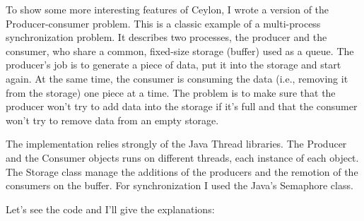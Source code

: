 
To show some more interesting features of Ceylon, I wrote a version of the
Producer-consumer problem. This is a classic example of a multi-process
synchronization problem. It describes two processes, the producer and the
consumer, who share a common, fixed-size storage (buffer) used as a queue. The
producer's job is to generate a piece of data, put it into the storage and start
again. At the same time, the consumer is consuming the data (i.e., removing it
from the storage) one piece at a time. The problem is to make sure that the
producer won't try to add data into the storage if it's full and that the
consumer won't try to remove data from an empty storage\cite{2_1}.

The implementation relies strongly of the Java Thread libraries. The Producer
and the Consumer objects runs on different threads, each instance of each
object. The Storage class manage the additions of the producers and the
remotion of the consumers on the buffer. For synchronization I used the Java's
Semaphore class.

Let's see the code and I'll give the explanations:

